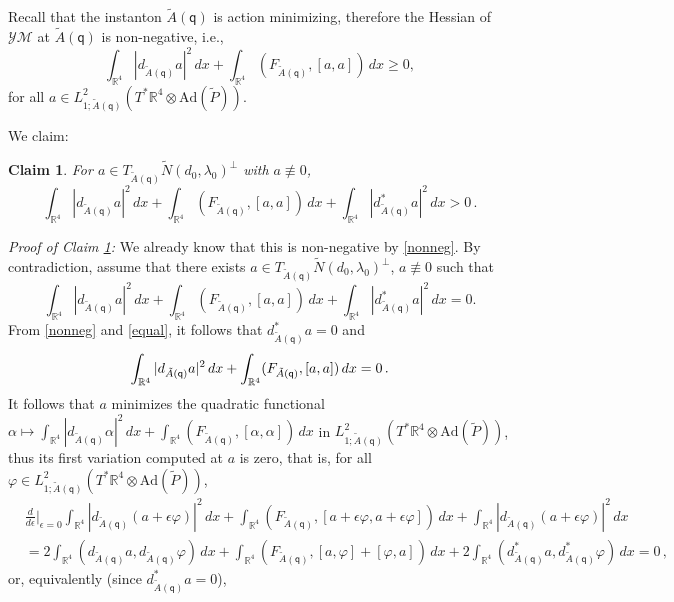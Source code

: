 \documentclass[11pt]{article}
\numberwithin{equation}{section} \setlength{\topmargin}{-35pt}
\newcommand{\R}{\mathbb{R}}
\newcommand{\Ad}{\text{Ad}}
\newcommand{\YM}{\mathcal{YM}}
\newcommand{\q}{\mathsf{q}}
\begin{document}
Recall that the instanton $\tilde{A}(\q)$ is action minimizing,
therefore the Hessian of $\YM$ at $\tilde{A}(\q)$ is non-negative,
i.e.,
\begin{equation}
\label{nonneg}
\int_{\R^4}|d_{\tilde{A}(\q)}a|^2\,dx+\int_{\R^4}(F_{\tilde{A}(\q)},[a,a])\,dx\ge
0,
\end{equation}
for all $a\in
L^2_{1;\tilde{A}(\q)}(T^{\ast}\R^4\otimes\Ad(\tilde{P}))$.

We claim:
\newtheorem{claim}{Claim}[section]
\begin{claim}
\label{Cl3.1} For $a\in
T_{\tilde{A}(\q)}\tilde{N}(d_0,\lambda_0)^{\perp}$ with $a\not\equiv
0$,
$$\int_{\R^4}|d_{\tilde{A}(\q)}a|^2\,dx+\int_{\R^4}(F_{\tilde{A}(\q)},[a,a])\,dx+
\int_{\R^4}|d_{\tilde{A}(\q)}^{\ast}a|^2\,dx>0\,.$$
\end{claim}
\textit{Proof of Claim \ref{Cl3.1}:} We already know that this is
non-negative by \eqref{nonneg}. By contradiction, assume that there
exists $a\in T_{\tilde{A}(\q)}\tilde{N}(d_0,\lambda_0)^{\perp}$,
$a\not\equiv 0$ such that
\begin{equation}
\label{equal}
\int_{\R^4}|d_{\tilde{A}(\q)}a|^2\,dx+\int_{\R^4}(F_{\tilde{A}(\q)},[a,a])\,dx+\int_{\R^4}|d_{\tilde{A}(\q)}^{\ast}a|^2\,dx=0.
\end{equation}
From \eqref{nonneg} and \eqref{equal}, it follows that
$d_{\tilde{A}(\q)}^{\ast}a=0$ and
\begin{equation}
\notag
\int_{\R^4}|d_{\tilde{A}(\q)}a|^2\,dx+\int_{\R^4}(F_{\tilde{A}(\q)},[a,a])\,dx
=0\,.
\end{equation}
It follows that $a$ minimizes the quadratic functional
$\alpha\mapsto\int_{\R^4}|d_{\tilde{A}(\q)}\alpha|^2\,dx+\int_{\R^4}(F_{\tilde{A}(\q)},[\alpha,\alpha])\,dx$
in $L^2_{1;\tilde{A}(\q)}(T^{\ast}\R^4\otimes\Ad(\tilde{P}))$, thus
its first variation computed at $a$ is zero, that is, for all
$\varphi\in
L^2_{1;\tilde{A}(\q)}(T^{\ast}\R^4\otimes\Ad(\tilde{P}))$,
\begin{align*}
&
\frac{d}{d\epsilon}\Big|_{\epsilon=0}\int_{\R^4}|d_{\tilde{A}(\q)}(a+\epsilon\varphi)|^2\,dx+
\int_{\R^4}(F_{\tilde{A}(\q)},[a+\epsilon\varphi,a+\epsilon\varphi])\,dx+
\int_{\R^4}|d_{\tilde{A}(\q)}(a+\epsilon\varphi)|^2\,dx\\
&=2\int_{\R^4}(d_{\tilde{A}(\q)}a,d_{\tilde{A}(\q)}\varphi)\,dx+
\int_{\R^4}(F_{\tilde{A}(\q)},[a,\varphi]+[\varphi,a])\,dx+
2\int_{\R^4}(d_{\tilde{A}(\q)}^{\ast}a,d_{\tilde{A}(\q)}^{\ast}\varphi)\,dx=0\,,
\end{align*}
or, equivalently (since $d_{\tilde{A}(\q)}^{\ast}a=0$),
\end{document}
